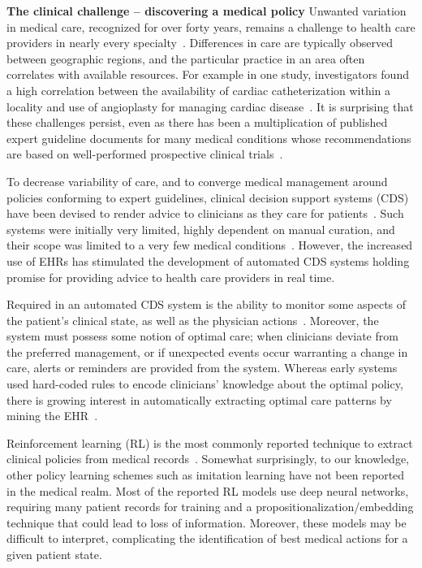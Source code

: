 \documentclass[letterpaper]{article}
\begin{document}
\textbf{The clinical challenge -- discovering a medical policy} Unwanted variation in medical care, recognized for over forty years, remains a challenge to health care providers in nearly every specialty~\cite{westert2018medical,karimi2017national,lilot2015variability}. Differences in care are typically observed between geographic regions, and the particular practice in an area often correlates with available resources. For example in one study, investigators found a high correlation between the availability of cardiac catheterization within a locality and use of angioplasty for managing cardiac disease~\cite{brownlee2010overtreated}. It is surprising that these challenges persist, even as there has been a multiplication of published expert guideline documents for many medical conditions whose recommendations are based on well-performed prospective clinical trials~\cite{weisz2007emergence}.

To decrease variability of care, and to converge medical management around policies conforming to expert guidelines, clinical decision support systems (CDS) have been devised to render advice to clinicians as they care for patients~\cite{osheroff2007roadmap}. Such systems were initially very limited, highly dependent on manual curation, and their scope was limited to a very few medical conditions~\cite{middleton2016clinical}. However, the increased use of EHRs has stimulated the development of automated CDS systems holding promise for providing advice to health care providers in real time.

Required in an automated CDS system is the ability to monitor some aspects of the patient's clinical state, as well as the physician actions~\cite{middleton2016clinical}. Moreover, the system must possess some notion of optimal care; when clinicians deviate from the preferred management, or if unexpected events occur warranting a change in care, alerts or reminders are provided from the system. Whereas early systems used hard-coded rules to encode clinicians' knowledge about the optimal policy, there is growing interest in automatically extracting optimal care patterns by mining the EHR~\cite{ohno2016using}.

Reinforcement learning (RL) is the most commonly reported technique to extract clinical policies from medical records~\cite{komorowski2018artificial,raghu2017continuous}. Somewhat surprisingly, to our knowledge, other policy learning schemes such as imitation learning have not been reported in the medical realm. Most of the reported RL models use deep neural networks, requiring many patient records for training and a propositionalization/embedding technique that could lead to loss of information.  Moreover, these models may be difficult to interpret, complicating the identification of best medical actions for a given patient state. %
\end{document}

